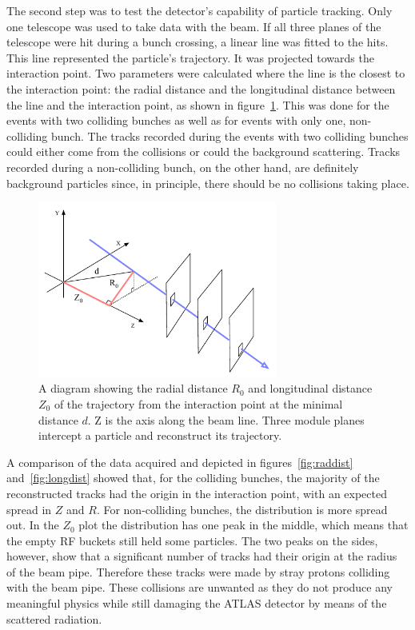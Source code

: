 The second step was to test the detector's capability of particle tracking. Only one telescope was used to take data with the beam. If all three planes of the telescope were hit during a bunch crossing, a linear line was fitted to the hits. This line represented the particle's trajectory. It was projected towards the interaction point. Two parameters were calculated where the line is the closest to the interaction point: the radial distance and the longitudinal distance between the line and the interaction point, as shown in figure~\ref{fig:z-r-distance}. This was done for the events with two colliding bunches as well as for events with only one, non-colliding bunch. The tracks recorded during the events with two colliding bunches could either come from the collisions or could the background scattering. Tracks recorded during a non-colliding bunch, on the other hand, are definitely background particles since, in principle, there should be no collisions taking place. 
\begin{figure}[!t]
\centering
\includegraphics[width=0.7\textwidth]{../scripts/04_charge_monitoring/plots/z-r-distance}
\caption{A diagram showing the radial distance $R_\mathrm{0}$ and longitudinal distance $Z_\mathrm{0}$ of the trajectory from the interaction point at the minimal distance $d$. Z is the axis along the beam line. Three module planes intercept a particle and reconstruct its trajectory.}
\label{fig:z-r-distance}
\end{figure}

A comparison of the data acquired and depicted in figures~\ref{fig:raddist} and~\ref{fig:longdist} showed that, for the colliding bunches, the majority of the reconstructed tracks had the origin in the interaction point, with an expected spread in $Z$ and $R$. For non-colliding bunches, the distribution is more spread out. In the $Z_\mathrm{0}$ plot the distribution has one peak in the middle, which means that the empty RF buckets still held some particles. The two peaks on the sides, however, show that a significant number of tracks had their origin at the radius of the beam pipe. Therefore these tracks were made by stray protons colliding with the beam pipe. These collisions are unwanted as they do not produce any meaningful physics while still damaging the ATLAS detector by means of the scattered radiation.

